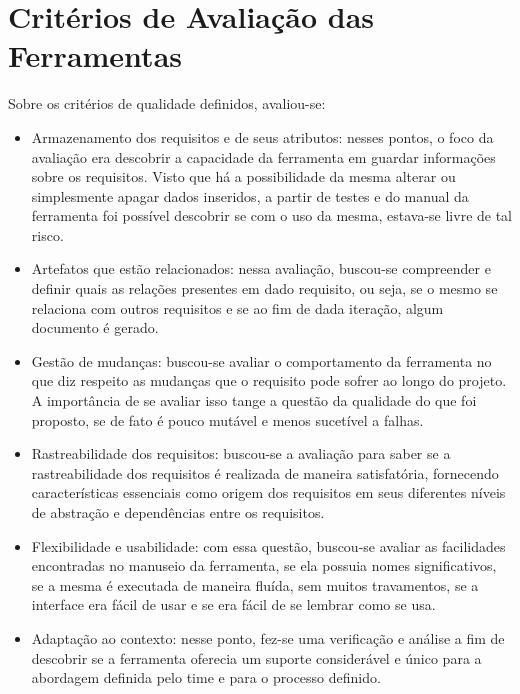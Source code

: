 \section[Critérios de Avaliação das Ferramentas]{Critérios de Avaliação das Ferramentas}
Sobre os critérios de qualidade definidos, avaliou-se:

\begin{itemize}
  \item Armazenamento dos requisitos e de seus atributos: nesses pontos, o foco da avaliação era descobrir a capacidade da ferramenta em guardar informações sobre os requisitos. Visto que há a possibilidade da mesma alterar ou simplesmente apagar dados inseridos, a partir de testes e do manual da ferramenta foi possível descobrir se com o uso da mesma, estava-se livre de tal risco.

  \item Artefatos que estão relacionados: nessa avaliação, buscou-se compreender e definir quais as relações presentes em dado requisito, ou seja, se o mesmo se relaciona com outros requisitos e se ao fim de dada iteração, algum documento é gerado.

  \item Gestão de mudanças: buscou-se avaliar o comportamento da ferramenta no que diz respeito as mudanças que o requisito pode sofrer ao longo do projeto. A importância de se avaliar isso tange a questão da qualidade do que foi proposto, se de fato é pouco mutável e menos sucetível a falhas.

  \item Rastreabilidade dos requisitos: buscou-se a avaliação para saber se a rastreabilidade dos requisitos é realizada de maneira satisfatória, fornecendo características essenciais como origem dos requisitos em seus diferentes níveis de abstração e dependências entre os requisitos.

  \item Flexibilidade e usabilidade: com essa questão, buscou-se avaliar as facilidades encontradas no manuseio da ferramenta, se ela possuia nomes significativos, se a mesma é executada de maneira fluída, sem muitos travamentos, se a interface era fácil de usar e se era fácil de se lembrar como se usa.

  \item Adaptação ao contexto: nesse ponto, fez-se uma verificação e análise a fim de descobrir se a ferramenta oferecia um suporte considerável e 
  único para a abordagem definida pelo time e para o processo definido.
\end{itemize}

